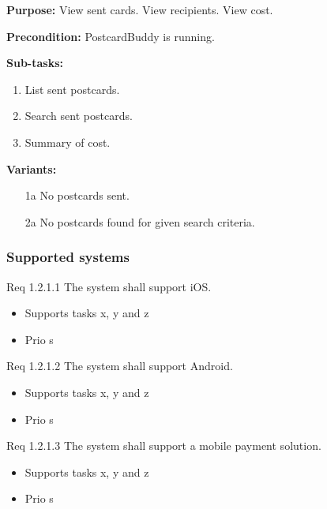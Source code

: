 \documentclass[10pt,a4paper]{article}
\begin{document}
\begin {description}
\begin {description}
\item \textbf{Purpose:} View sent cards. View recipients. View cost.
\item \textbf{Precondition:} PostcardBuddy is running. 

\item \textbf{Sub-tasks:}
\begin{enumerate}
\item List sent postcards. 
\item Search sent postcards.
\item Summary of cost.  

\end{enumerate}
\item \textbf{Variants:}
\begin{itemize}[label={}]

\item[1a] No postcards sent. 
\item[2a] No postcards found for given search criteria. 

\end{itemize}
\end{description}


\end{description}

\subsubsection{Supported systems}
\begin {description}
\item [Req 1.2.1.1] The system shall support iOS.
\begin{itemize}
\item Supports tasks x, y and z
\item Prio s
\end{itemize}
\item [Req 1.2.1.2] The system shall support Android.
\begin{itemize}
\item Supports tasks x, y and z
\item Prio s
\end{itemize}
\item [Req 1.2.1.3] The system shall support a mobile payment solution. 
\begin{itemize}
\item Supports tasks x, y and z
\item Prio s
\end{itemize}
\end{description}
\end{document}
